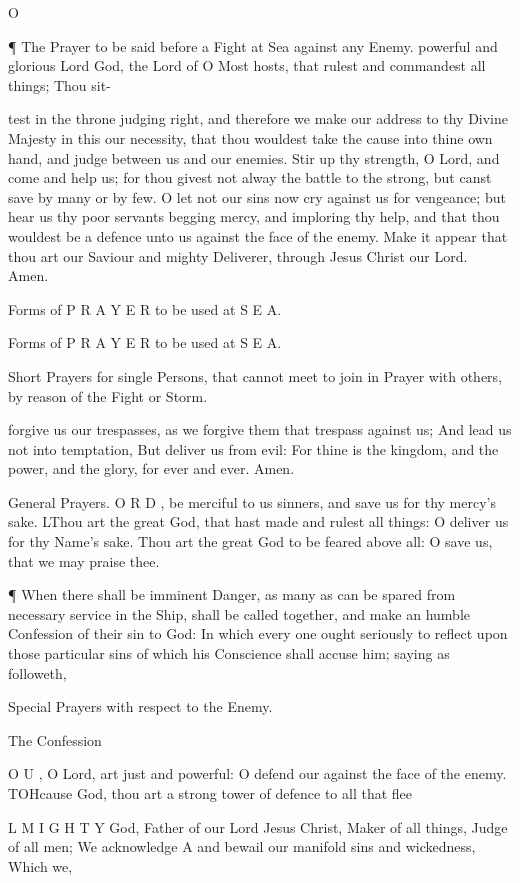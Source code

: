 O

¶ The Prayer to be said before a Fight at Sea against any Enemy. powerful and glorious Lord God, the Lord of O Most hosts, that rulest and commandest all things; Thou sit-

test in the throne judging right, and therefore we make our address to thy Divine Majesty in this our necessity, that thou wouldest take the cause into thine own hand, and judge between us and our enemies. Stir up thy strength, O Lord, and come and help us; for thou givest not alway the battle to the strong, but canst save by many or by few. O let not our sins now cry against us for vengeance; but hear us thy poor servants begging mercy, and imploring thy help, and that thou wouldest be a defence unto us against the face of the enemy. Make it appear that thou art our Saviour and mighty Deliverer, through Jesus Christ our Lord. Amen.

Forms of P R A Y E R to be used at S E A.

Forms of P R A Y E R to be used at S E A.

Short Prayers for single Persons, that cannot meet to join in Prayer with others, by reason of the Fight or Storm.

forgive us our trespasses, as we forgive them that trespass against us; And lead us not into temptation, But deliver us from evil: For thine is the kingdom, and the power, and the glory, for ever and ever. Amen.

General Prayers. O R D , be merciful to us sinners, and save us for thy mercy’s sake. LThou art the great God, that hast made and rulest all things: O deliver us for thy Name’s sake. Thou art the great God to be feared above all: O save us, that we may praise thee.

¶ When there shall be imminent Danger, as many as can be spared from necessary service in the Ship, shall be called together, and make an humble Confession of their sin to God: In which every one ought seriously to reflect upon those particular sins of which his Conscience shall accuse him; saying as followeth,

Special Prayers with respect to the Enemy.

The Confession

O U , O Lord, art just and powerful: O defend our against the face of the enemy. TOHcause God, thou art a strong tower of defence to all that flee

L M I G H T Y God, Father of our Lord Jesus Christ, Maker of all things, Judge of all men; We acknowledge A and bewail our manifold sins and wickedness, Which we,

